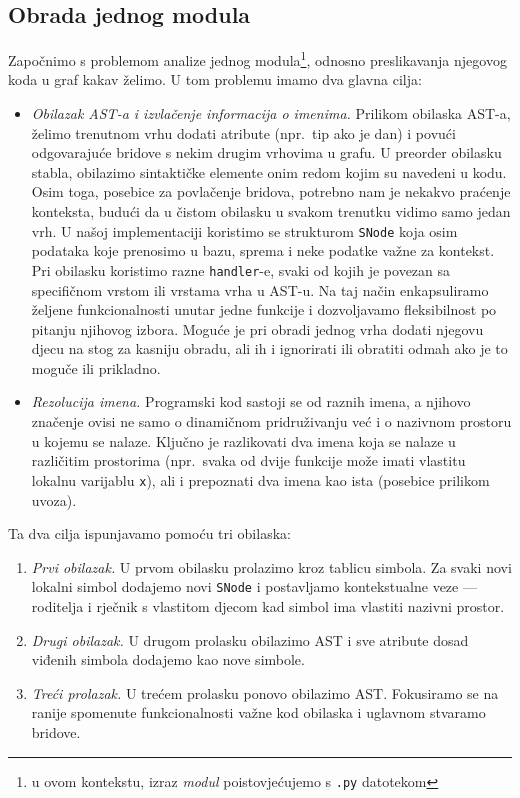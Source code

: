 \subsection{Obrada jednog modula}
Započnimo s problemom analize jednog modula\footnote{u ovom kontekstu,
izraz \emph{modul} poistovjećujemo s \texttt{.py} datotekom},
 odnosno preslikavanja njegovog koda u graf kakav želimo. U tom problemu imamo
dva glavna cilja:
\begin{itemize}
\item \textit{Obilazak AST-a i izvlačenje informacija o imenima.} Prilikom obilaska AST-a, želimo trenutnom vrhu
dodati atribute (npr.\ tip ako je dan) i povući odgovarajuće bridove s nekim drugim vrhovima u grafu. U
preorder obilasku stabla, obilazimo sintaktičke elemente onim redom kojim su navedeni u kodu. Osim toga,
posebice za povlačenje bridova, potrebno nam je nekakvo praćenje konteksta, budući da u čistom
obilasku u svakom trenutku vidimo samo jedan vrh. U našoj implementaciji koristimo se strukturom
\texttt{SNode} koja osim podataka koje prenosimo u bazu, sprema i neke podatke važne za kontekst.
Pri obilasku koristimo razne \texttt{handler}-e, svaki od kojih je povezan sa specifičnom
vrstom ili vrstama vrha u AST-u. Na taj način enkapsuliramo željene funkcionalnosti unutar
jedne funkcije i dozvoljavamo fleksibilnost po pitanju njihovog izbora. Moguće je pri
obradi jednog vrha dodati njegovu djecu na stog za kasniju obradu, ali ih i ignorirati ili
obratiti odmah ako je to moguče ili prikladno.

\item \textit{Rezolucija imena.} Programski kod sastoji se od raznih imena, a njihovo značenje ovisi ne samo
o dinamičnom pridruživanju već i o nazivnom prostoru u kojemu se nalaze. Ključno je razlikovati dva
imena koja se nalaze u različitim prostorima (npr.\ svaka od dvije funkcije može imati vlastitu lokalnu
varijablu \texttt{x}), ali i prepoznati dva imena kao ista (posebice prilikom uvoza).
\end{itemize}

Ta dva cilja ispunjavamo pomoću tri obilaska:
\begin{enumerate}
\item \textit{Prvi obilazak.} U prvom obilasku prolazimo kroz tablicu simbola.
	Za svaki novi lokalni simbol dodajemo novi \texttt{SNode} i postavljamo
	kontekstualne veze --- roditelja i rječnik s vlastitom djecom kad simbol
	ima vlastiti nazivni prostor.
\item \textit{Drugi obilazak.} U drugom prolasku obilazimo AST i sve atribute dosad viđenih
	simbola dodajemo kao nove simbole.
\item \textit{Treći prolazak.} U trećem prolasku ponovo obilazimo AST. Fokusiramo se na ranije spomenute
	funkcionalnosti važne kod obilaska i uglavnom stvaramo bridove.
\end{enumerate}


